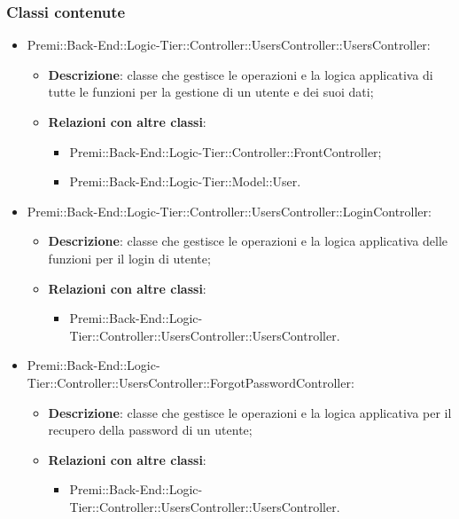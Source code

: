 	\subsubsection*{Classi contenute}
		\begin{itemize}
			\item Premi::Back-End::Logic-Tier::Controller::UsersController::UsersController:
			\begin{itemize}
				\item \textbf{Descrizione}: classe che gestisce le operazioni e la logica applicativa di tutte le funzioni per la gestione di un utente e dei suoi dati;
				\item \textbf{Relazioni con altre classi}:
				\begin{itemize}
					\item Premi::Back-End::Logic-Tier::Controller::FrontController;
					\item Premi::Back-End::Logic-Tier::Model::User.
				\end{itemize}
			\end{itemize}
			
			\item Premi::Back-End::Logic-Tier::Controller::UsersController::LoginController:
			\begin{itemize}
				\item \textbf{Descrizione}: classe che gestisce le operazioni e la logica applicativa delle funzioni per il login di utente;
				\item \textbf{Relazioni con altre classi}:
				\begin{itemize}
					\item Premi::Back-End::Logic-Tier::Controller::UsersController::UsersController.
				\end{itemize}
			\end{itemize}
			
			\item Premi::Back-End::Logic-Tier::Controller::UsersController::ForgotPasswordController:
			\begin{itemize}
				\item \textbf{Descrizione}: classe che gestisce le operazioni e la logica applicativa per il recupero della password di un utente;
				\item \textbf{Relazioni con altre classi}:
				\begin{itemize}
					\item Premi::Back-End::Logic-Tier::Controller::UsersController::UsersController.
				\end{itemize}
			\end{itemize}
			

\end{itemize}
